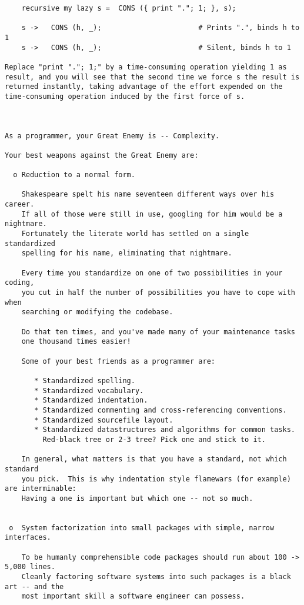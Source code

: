 \begin{verbatim}
    recursive my lazy s =  CONS ({ print "."; 1; }, s);  
 
    s ->   CONS (h, _);                       # Prints ".", binds h to 1  
    s ->   CONS (h, _);                       # Silent, binds h to 1  
 
Replace "print "."; 1;" by a time-consuming operation yielding 1 as 
result, and you will see that the second time we force s the result is 
returned instantly, taking advantage of the effort expended on the 
time-consuming operation induced by the first force of s. 
 


As a programmer, your Great Enemy is -- Complexity.

Your best weapons against the Great Enemy are:

  o Reduction to a normal form.

    Shakespeare spelt his name seventeen different ways over his career.
    If all of those were still in use, googling for him would be a nightmare.
    Fortunately the literate world has settled on a single standardized
    spelling for his name, eliminating that nightmare. 

    Every time you standardize on one of two possibilities in your coding,
    you cut in half the number of possibilities you have to cope with when
    searching or modifying the codebase.

    Do that ten times, and you've made many of your maintenance tasks
    one thousand times easier!

    Some of your best friends as a programmer are:

       * Standardized spelling.
       * Standardized vocabulary.
       * Standardized indentation.
       * Standardized commenting and cross-referencing conventions.
       * Standardized sourcefile layout.
       * Standardized datastructures and algorithms for common tasks.
         Red-black tree or 2-3 tree? Pick one and stick to it.

    In general, what matters is that you have a standard, not which standard
    you pick.  This is why indentation style flamewars (for example) are interminable:
    Having a one is important but which one -- not so much.


 o  System factorization into small packages with simple, narrow interfaces.

    To be humanly comprehensible code packages should run about 100 -> 5,000 lines.
    Cleanly factoring software systems into such packages is a black art -- and the
    most important skill a software engineer can possess.


\end{verbatim}
